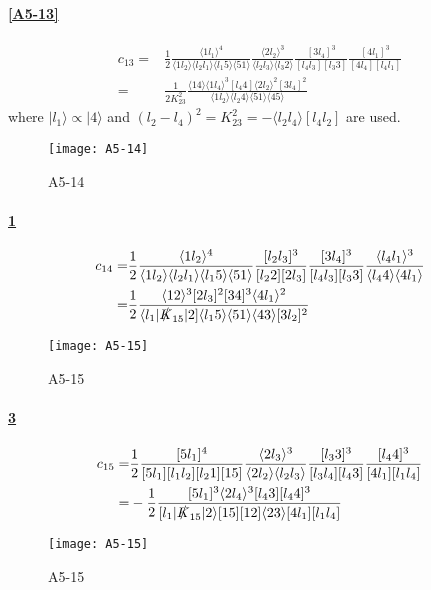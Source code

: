 \paragraph{\ref{A5-13}}
\begin{equation*}
\begin{split}
c_{13} = &
\frac{1}{2}\frac{\langle 1 l_1 \rangle^4}{\langle 1 l_2 \rangle\langle l_2 l_1 \rangle\langle l_1 5 \rangle\langle 51 \rangle}
\frac{\langle 2l_2\rangle^3}{\langle l_2 l_3\rangle\langle l_3 2 \rangle}
\frac{[3l_4]^3}{[l_4 l_3][l_3 3]}
\frac{[4l_1]^3}{[4l_4][l_4l_1]}
\\
= &
\frac{1}{2K_{23}^2}\frac{\langle 14\rangle\langle 1 l_4\rangle^3[l_4 4]\langle 2l_2\rangle^2[3l_4]^2}{\langle 1l_2\rangle\langle l_2 4\rangle\langle 51\rangle\langle 45\rangle}
\end{split}
\end{equation*}
where $|l_1\rangle \propto |4\rangle$ and $(l_2 - l_4)^2 = K_{23}^2 = -\langle l_2 l_4\rangle[l_4l_2]$ are used.
%
%
\begin{figure}
  \centering
    \texttt{[image: A5-14]}
    \caption{A5-14}
  \label{A5-14}
\end{figure}
\paragraph{\ref{A5-14}}
\begin{equation*}
\begin{split}
c_{14} = & \frac{1}{2}\frac{\langle 1l_2\rangle^4}{\langle 1 l_2 \rangle\langle l_2 l_1 \rangle\langle l_1 5\rangle\langle 5 1\rangle}
\frac{[l_2 l_3]^3}{[l_2 2 ][2 l_3]}
\frac{[3l_4]^3}{[l_4 l_3][l_3 3]}
\frac{\langle l_4 l_1 \rangle^3}{\langle l_4 4 \rangle\langle 4 l_1\rangle}
\\
= &
\frac{1}{2}
\frac{\langle 12 \rangle^3[2l_3]^2[34]^3\langle 4 l_1 \rangle^2}{\langle l_1 |\slashed{K}_{15}|2]\langle l_1 5\rangle\langle 51 \rangle\langle 43\rangle[3l_2]^2}
\end{split}
\end{equation*}
%
%
\begin{figure}
  \centering
    \texttt{[image: A5-15]}
    \caption{A5-15}
  \label{A5-15}
\end{figure}
\paragraph{\ref{A5-15}}
\begin{equation*}
\begin{split}
c_{15} = &
\frac{1}{2}
\frac{[5l_1]^4}{[5l_1][l_1  l_2][l_2 1][15]}
\frac{\langle 2 l_3\rangle^3}{\langle 2 l_2 \rangle\langle l_2 l_3\rangle}
\frac{[l_3 3 ]^3}{[l_3 l_4][l_4 3]}
\frac{[l_4 4]^3}{[4l_1][l_1 l_4]}
\\
= &
-\frac{1}{2}
\frac{[5l_1]^3\langle 2l_4\rangle^3[l_4 3][l_4 4]^3}{[l_1|\slashed{K}_{15}|2\rangle [15][12]\langle 23\rangle[4l_1][l_1l_4]}
\end{split}
\end{equation*}
%
%
\begin{figure}
  \centering
    \texttt{[image: A5-15]}
    \caption{A5-15}
  \label{A5-15}
\end{figure}
